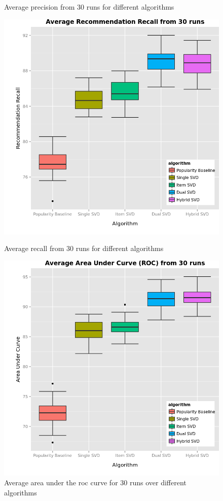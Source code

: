 \begin{figure}[!tbp]
\begin{minipage}[b]{0.45\textwidth}
    \caption{Average precision from 30 runs for different algorithms}
    \label{fig:precision}
  \end{minipage}
\centering
  \hfill
  \begin{minipage}[b]{0.45\textwidth}
    \includegraphics[width=\textwidth]{recent_images/recall.png}
    \caption{Average recall from 30 runs for different algorithms}
    \label{fig:recall}
  \end{minipage}
  \hfill
  \begin{minipage}[b]{0.45\textwidth}
    \includegraphics[width=\textwidth]{recent_images/auc.png}
    \caption{Average area under the roc curve for 30 runs over different algorithms}
    \label{fig:auc}
  \end{minipage}
\end{figure}

